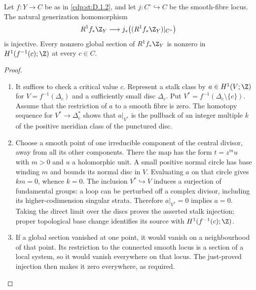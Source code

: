 \begin{proposition}\hypertarget{tag-01G6}{}\label{cdp:st:D.1.8}

Let $f:Y\to C$ be as in \ref{cdp:st:D.1.2}, and let $j:C^\circ\hookrightarrow C$
be the smooth-fibre locus. The natural generization homomorphism
\[
R^1f_*\Z_Y\longrightarrow
j_*\bigl((R^1f_*\Z_Y)|_{C^\circ}\bigr)
\]
is injective. Every nonzero global section of $R^1f_*\Z_Y$ is
nonzero in $H^1(f^{-1}(c);\Z)$ at every $c\in C$.
\end{proposition}


\begin{proof}

\begin{enumerate}[label={$\langle1\rangle$\arabic*.},leftmargin=*]
\item It suffices to check a critical value $c$. Represent a stalk class
by $a\in H^1(V;\Z)$ for $V=f^{-1}(\Delta_c)$ and a sufficiently
small disc $\Delta_c$. Put $V^*=f^{-1}(\Delta_c\setminus\{c\})$.
Assume that the restriction of $a$ to a smooth fibre is zero.
The homotopy sequence for $V^*\to\Delta_c^*$ shows that
$a|_{V^*}$ is the pullback of an integer multiple $k$ of the
positive meridian class of the punctured disc.

\item Choose a smooth point of one irreducible component of the central
divisor, away from all its other components. There the map has
the form $t=z^m u$ with $m>0$ and $u$ a holomorphic unit.
A small positive normal circle has base winding $m$ and bounds
its normal disc in $V$. Evaluating $a$ on that circle gives
$km=0$, whence $k=0$.
The inclusion $V^*\hookrightarrow V$ induces a surjection of
fundamental groups: a loop can be perturbed off a complex divisor,
including its higher-codimension singular strata. Therefore
$a|_{V^*}=0$ implies $a=0$.
Taking the direct limit over the discs proves the asserted stalk
injection; proper topological base change identifies its source
with $H^1(f^{-1}(c);\Z)$.

\item If a global section vanished at one point, it would vanish on a
neighbourhood of that point. Its restriction to the connected
smooth locus is a section of a local system, so it would vanish
everywhere on that locus. The just-proved injection then makes
it zero everywhere, as required.

\end{enumerate}
\end{proof}